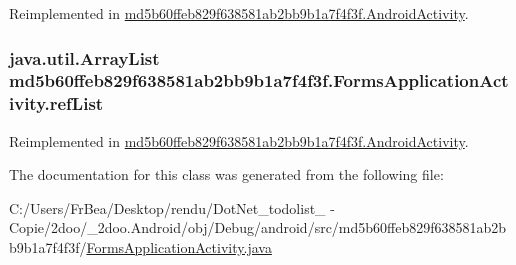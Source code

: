 Reimplemented in \hyperlink{classmd5b60ffeb829f638581ab2bb9b1a7f4f3f_1_1_android_activity_96cef65bd666995b23bcd03497dea337}{md5b60ffeb829f638581ab2bb9b1a7f4f3f.AndroidActivity}.\hypertarget{classmd5b60ffeb829f638581ab2bb9b1a7f4f3f_1_1_forms_application_activity_b244a537e01278d3ee4186b6bceb6755}{
\subsubsection[{refList}]{\setlength{\rightskip}{0pt plus 5cm}java.util.ArrayList {\bf md5b60ffeb829f638581ab2bb9b1a7f4f3f.FormsApplicationActivity.refList}}}
\label{classmd5b60ffeb829f638581ab2bb9b1a7f4f3f_1_1_forms_application_activity_b244a537e01278d3ee4186b6bceb6755}




Reimplemented in \hyperlink{classmd5b60ffeb829f638581ab2bb9b1a7f4f3f_1_1_android_activity_5c1d60bfbc05ceae734119d4d979b8cc}{md5b60ffeb829f638581ab2bb9b1a7f4f3f.AndroidActivity}.

The documentation for this class was generated from the following file:\begin{CompactItemize}
\item 
C:/Users/FrBea/Desktop/rendu/DotNet\_\-todolist\_ - Copie/2doo/\_\-2doo.Android/obj/Debug/android/src/md5b60ffeb829f638581ab2bb9b1a7f4f3f/\hyperlink{_forms_application_activity_8java}{FormsApplicationActivity.java}\end{CompactItemize}
